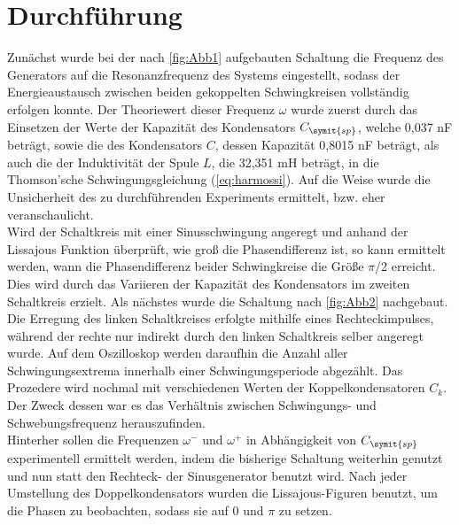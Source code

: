 \section{Durchführung}
Zunächst wurde bei der nach \autoref{fig:Abb1} aufgebauten Schaltung die Frequenz des Generators auf die Resonanzfrequenz des Systems eingestellt, sodass der Energieaustausch zwischen beiden gekoppelten Schwingkreisen vollständig erfolgen konnte. Der Theoriewert dieser Frequenz \(\omega\) wurde zuerst durch das Einsetzen der Werte der Kapazität des Kondensators \(C_{\symit{sp}}\), welche 0,037 nF beträgt, sowie die des Kondensators \(C\), dessen Kapazität 0,8015 nF beträgt, als auch die der Induktivität der Spule \(L\), die 32,351 mH beträgt, in die Thomson'sche Schwingungsgleichung (\autoref{eq:harmossi}). Auf die Weise wurde die Unsicherheit des zu durchführenden Experiments ermittelt, bzw. eher veranschaulicht.
\\
Wird der Schaltkreis mit einer Sinusschwingung angeregt und anhand der Lissajous Funktion überprüft, wie groß die Phasendifferenz ist, so kann ermittelt werden, wann die Phasendifferenz beider Schwingkreise die Größe \(\pi\)/2 erreicht. Dies wird durch das Variieren der Kapazität des Kondensators im zweiten Schaltkreis erzielt.
Als nächstes wurde die Schaltung nach \autoref{fig:Abb2} nachgebaut. Die Erregung des linken Schaltkreises erfolgte mithilfe eines Rechteckimpulses, während der rechte nur indirekt durch den linken Schaltkreis selber angeregt wurde. Auf dem Oszilloskop werden daraufhin die Anzahl aller Schwingungsextrema innerhalb einer Schwingungsperiode abgezählt. Das Prozedere wird nochmal mit verschiedenen Werten der Koppelkondensatoren \(C_k\). Der Zweck dessen war es das Verhältnis zwischen Schwingungs- und Schwebungsfrequenz herauszufinden. 
\\
Hinterher sollen die Frequenzen \(\omega^-\) und \(\omega^+\) in Abhängigkeit von \(C_{\symit{sp}}\) experimentell ermittelt werden, indem die bisherige Schaltung weiterhin genutzt und nun statt den Rechteck- der Sinusgenerator benutzt wird. Nach jeder Umstellung des Doppelkondensators wurden die Lissajous-Figuren benutzt, um die Phasen zu beobachten, sodass sie auf 0 und \(\pi\) zu setzen. 
\\%

